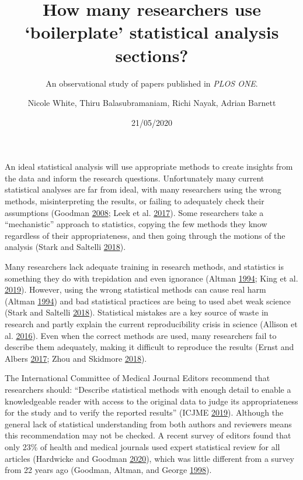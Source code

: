 \documentclass[
]{article}
\title{How many researchers use `boilerplate' statistical analysis sections?}
\subtitle{An observational study of papers published in \emph{PLOS ONE}.}
\author{Nicole White, Thiru Balasubramaniam, Richi Nayak, Adrian Barnett}
\date{21/05/2020}
\begin{document}
\maketitle

An ideal statistical analysis will use appropriate methods to create
insights from the data and inform the research questions. Unfortunately
many current statistical analyses are far from ideal, with many
researchers using the wrong methods, misinterpreting the results, or
failing to adequately check their assumptions (Goodman
\protect\hyperlink{ref-Goodman2008}{2008}; Leek et al.
\protect\hyperlink{ref-Leek2017}{2017}). Some researchers take a
``mechanistic'' approach to statistics, copying the few methods they
know regardless of their appropriateness, and then going through the
motions of the analysis (Stark and Saltelli
\protect\hyperlink{ref-Stark2018}{2018}).

Many researchers lack adequate training in research methods, and
statistics is something they do with trepidation and even ignorance
(Altman \protect\hyperlink{ref-Altman1994}{1994}; King et al.
\protect\hyperlink{ref-King2019}{2019}). However, using the wrong
statistical methods can cause real harm (Altman
\protect\hyperlink{ref-Altman1994}{1994}) and bad statistical practices
are being to used abet weak science (Stark and Saltelli
\protect\hyperlink{ref-Stark2018}{2018}). Statistical mistakes are a key
source of waste in research and partly explain the current
reproducibility crisis in science (Allison et al.
\protect\hyperlink{ref-Allison2016}{2016}). Even when the correct
methods are used, many researchers fail to describe them adequately,
making it difficult to reproduce the results (Ernst and Albers
\protect\hyperlink{ref-Ernst2017}{2017}; Zhou and Skidmore
\protect\hyperlink{ref-Zhou2018}{2018}).

The International Committee of Medical Journal Editors recommend that
researchers should: ``Describe statistical methods with enough detail to
enable a knowledgeable reader with access to the original data to judge
its appropriateness for the study and to verify the reported results''
(ICJME \protect\hyperlink{ref-ICMJE2019}{2019}). Although the general
lack of statistical understanding from both authors and reviewers means
this recommendation may not be checked. A recent survey of editors found
that only 23\% of health and medical journals used expert statistical
review for all articles (Hardwicke and Goodman
\protect\hyperlink{ref-Hardwicke2020}{2020}), which was little different
from a survey from 22 years ago (Goodman, Altman, and George
\protect\hyperlink{ref-Goodman1998}{1998}).
\end{document}
